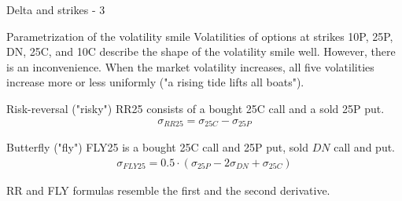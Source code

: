 \documentclass{beamer}
\begin{document}
\newcommand{\drawVolNode}[4] {

	\node[
		circle,
		color=Set1-B,
		fill,
		inner sep=2pt
	] at (#1, #2) {};
	
	\node[anchor=#4] at (#1, #2) {$\sigma_{#3}$};
}

\begin{frame}{Delta and strikes - 3}
\centering
{}
\end{frame}



\begin{frame}{Parametrization of the volatility smile}
\justify
Volatilities of options at strikes 10P, 25P, DN, 25C, and 10C describe the shape of the volatility smile well. However, there is an inconvenience. When the market volatility increases, all five volatilities increase more or less uniformly ("a rising tide lifts all boats").

\justify
\alert{Risk-reversal ("risky")} RR25 consists of a bought 25C call and a sold 25P put.
\begin{align*}
\sigma_{RR25} = \sigma_{25C} - \sigma_{25P}
\end{align*}

\justify
\alert{Butterfly ("fly")} FLY25 is a bought 25C call and 25P put, sold $DN$ call and put.
\begin{align*}
\sigma_{FLY25} = 0.5\cdot(\sigma_{25P} - 2\sigma_{DN} + \sigma_{25C})
\end{align*}

\justify
RR and FLY formulas resemble the first and the second derivative.
\end{frame}
\end{document}
